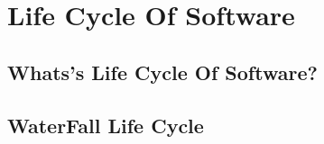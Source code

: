 \section{Life Cycle Of Software}
\subsection{Whats's Life Cycle Of Software?}
\subsection{WaterFall Life Cycle}

